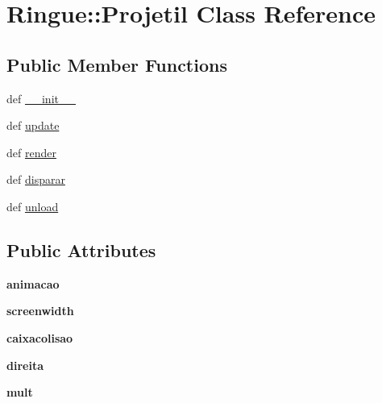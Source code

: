 \hypertarget{class_ringue_1_1_projetil}{
\section{Ringue::Projetil Class Reference}
\label{class_ringue_1_1_projetil}
}
\subsection*{Public Member Functions}
\begin{CompactItemize}
\item 
def \hyperlink{class_ringue_1_1_projetil_6034b46e61e22a362ba5ad0003ab1ef7}{\_\-\_\-init\_\-\_\-}
\item 
def \hyperlink{class_ringue_1_1_projetil_790565deda378720a1665e7a1033ddb8}{update}
\item 
def \hyperlink{class_ringue_1_1_projetil_8dc4d0480366c09189d0aa90ea131032}{render}
\item 
def \hyperlink{class_ringue_1_1_projetil_7b77cc2e74d9332d4d48e2fad93bdeb5}{disparar}
\item 
def \hyperlink{class_ringue_1_1_projetil_a3fb7d6b9b2c544691ac58c3b528e207}{unload}
\end{CompactItemize}
\subsection*{Public Attributes}
\begin{CompactItemize}
\item 
\hypertarget{class_ringue_1_1_projetil_516b411e6d75e0ecdfe5543868e06f8b}{
\textbf{animacao}}
\label{class_ringue_1_1_projetil_516b411e6d75e0ecdfe5543868e06f8b}

\item 
\hypertarget{class_ringue_1_1_projetil_a2b5d3c28642a18020b17942e89a444f}{
\textbf{screenwidth}}
\label{class_ringue_1_1_projetil_a2b5d3c28642a18020b17942e89a444f}

\item 
\hypertarget{class_ringue_1_1_projetil_48d619e221d54b1b2e9c78e971c86ae3}{
\textbf{caixacolisao}}
\label{class_ringue_1_1_projetil_48d619e221d54b1b2e9c78e971c86ae3}

\item 
\hypertarget{class_ringue_1_1_projetil_ecee769bc1458ab692d1e6352cf9bf9d}{
\textbf{direita}}
\label{class_ringue_1_1_projetil_ecee769bc1458ab692d1e6352cf9bf9d}

\item 
\hypertarget{class_ringue_1_1_projetil_abb9d2c5dae8213527e6d75a3477a835}{
\textbf{mult}}
\label{class_ringue_1_1_projetil_abb9d2c5dae8213527e6d75a3477a835}

\end{CompactItemize}



